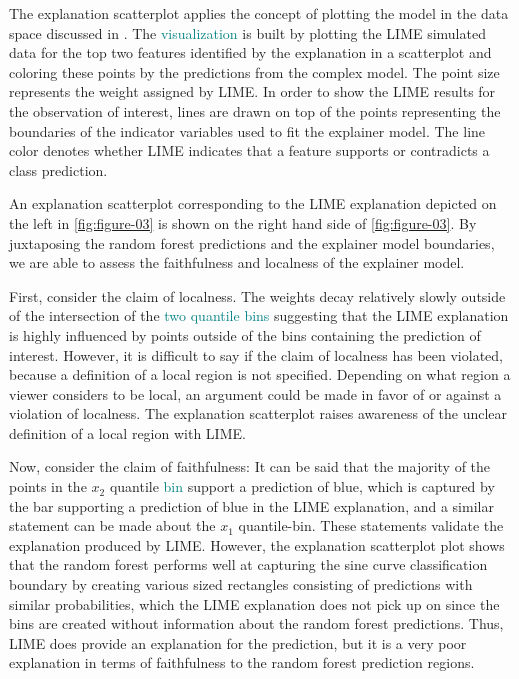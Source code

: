 \documentclass[AMS,STIX2COL]{WileyNJD-v2}\usepackage[]{graphicx}\usepackage[]{color}
\newcommand{\kge}[1]{\textcolor{teal}{#1}}
\renewcommand{\sout}[1]{\unskip}
\begin{document}
The explanation scatterplot applies the concept of plotting the model in the data space discussed in \citet{wickham:2015}. The \kge{visualization} \sout{plot} is built by plotting the LIME simulated data for the top two features identified by the explanation in a scatterplot and coloring these points by the predictions from the complex model. The point size represents the weight assigned by LIME. In order to show the LIME results for the observation of interest, lines are drawn on top of the points representing the boundaries of the indicator variables used to fit the explainer model. The line color denotes whether LIME indicates that a feature supports or contradicts a class prediction. 

An explanation scatterplot corresponding to the LIME explanation depicted on the left in \autoref{fig:figure-03} is shown on the right hand side of \autoref{fig:figure-03}. By juxtaposing the random forest predictions and the explainer model boundaries, we are able to assess the faithfulness and localness of the explainer model. 

First, consider the claim of localness. The weights decay relatively slowly outside of the intersection of the \kge{two quantile bins} \sout{2-quantile-bin} suggesting that the LIME explanation is highly influenced by points outside of the bins containing the prediction of interest. However, it is difficult to say if the claim of localness has been violated, because a definition of a local region is not specified. Depending on what region a viewer considers to be local, an argument could be made in favor of or against a violation of localness. The explanation scatterplot raises awareness of the unclear definition of a local region with LIME. \sout{Nevertheless, it is possible to say that the weights assigned to the simulated data do not capture the local region identified by the intersection of the quantile bins.}

Now, consider the claim of faithfulness: It can be said that the majority of the points in the $x_2$ quantile \kge{bin} support a prediction of blue, which is captured by the bar supporting a prediction of blue in the LIME explanation, and a similar statement can be made about the $x_1$ quantile-bin. These statements validate the explanation produced by LIME. However, the explanation scatterplot plot shows that the random forest performs well at capturing the sine curve classification boundary by creating various sized rectangles consisting of predictions with similar probabilities, which the LIME explanation does not pick up on since the bins are created without information about the random forest predictions. Thus, LIME does provide an explanation for the prediction, but it is a very poor explanation in terms of faithfulness to the random forest prediction regions.
\end{document}
